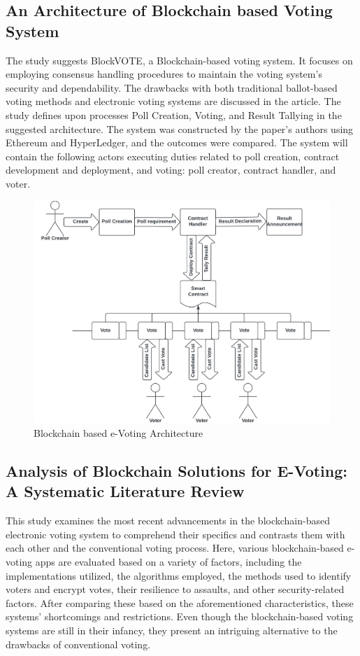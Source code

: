 \documentclass[10pt,final,journal,a4paper,oneside,twocolumn]{IEEEtran}
\begin{document}
		\subsection{An Architecture of Blockchain based Voting System \cite{angsuchotmetee2019blockvote}}
			The study suggests BlockVOTE, a Blockchain-based voting system. It focuses on employing consensus handling procedures to maintain the voting system's security and dependability. The drawbacks with both traditional ballot-based voting methods and electronic voting systems are discussed in the article. The study defines upon processes Poll Creation, Voting, and Result Tallying in the suggested architecture. The system was constructed by the paper's authors using Ethereum and HyperLedger, and the outcomes were compared. The system will contain the following actors executing duties related to poll creation, contract development and deployment, and voting: poll creator, contract handler, and voter.
			\begin{figure}[H]
				\includegraphics[width=\linewidth]{./Resources/architecture.png}
			    \caption{Blockchain based e-Voting Architecture}
			\end{figure}

		\subsection{Analysis of Blockchain Solutions for E-Voting: A Systematic Literature Review \cite{benabdallah2022analysis}}
			This study examines the most recent advancements in the blockchain-based electronic voting system to comprehend their specifics and contrasts them with each other and the conventional voting process. Here, various blockchain-based e-voting apps are evaluated based on a variety of factors, including the implementations utilized, the algorithms employed, the methods used to identify voters and encrypt votes, their resilience to assaults, and other security-related factors. After comparing these based on the aforementioned characteristics, these systems' shortcomings and restrictions. Even though the blockchain-based voting systems are still in their infancy, they present an intriguing alternative to the drawbacks of conventional voting.
\end{document}
